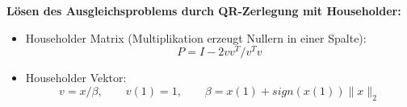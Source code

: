 \documentclass[a4paper]{article}
\begin{document}
{\bf Lösen des Ausgleichsproblems durch QR-Zerlegung mit Householder:}\cite{Golub1989}
\begin{itemize}
\item Householder Matrix (Multiplikation erzeugt Nullern in einer Spalte):
  \begin{equation*}
    P = I - 2vv^T / v^Tv
  \end{equation*}
\item Householder Vektor:
  \begin{equation*}
    v = x / \beta,\qquad v(1) = 1, \qquad \beta = x(1) + sign(x(1)) \|x\|_2
  \end{equation*}
\end{itemize}



\end{document}
